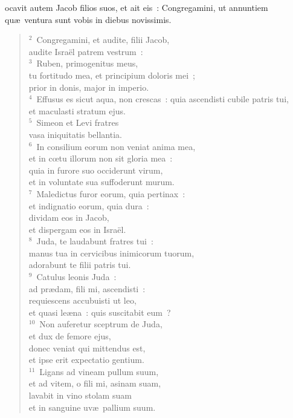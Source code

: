 \bchapter
{}ocavit autem Jacob filios suos, et ait eis~: Congregamini, ut annuntiem qu\ae\ ventura sunt vobis in diebus novissimis.
\begin{flushleft}\begin{verse}\vspace{6pt}${}^{2}$~Congregamini, et audite, filii Jacob,\\ audite Isra\"el patrem vestrum~:\\
${}^{3}$~Ruben, primogenitus meus,\\ tu fortitudo mea, et principium doloris mei~;\\ prior in donis, major in imperio.\\
${}^{4}$~Effusus es sicut aqua, non crescas~: quia ascendisti cubile patris tui,\\ et maculasti stratum ejus.\\
${}^{5}$~Simeon et Levi fratres\\ vasa iniquitatis bellantia.\\
${}^{6}$~In consilium eorum non veniat anima mea,\\ et in cœtu illorum non sit gloria mea~:\\ quia in furore suo occiderunt virum,\\ et in voluntate sua suffoderunt murum.\\
${}^{7}$~Maledictus furor eorum, quia pertinax~:\\ et indignatio eorum, quia dura~:\\ dividam eos in Jacob,\\ et dispergam eos in Isra\"el.\\
${}^{8}$~Juda, te laudabunt fratres tui~:\\ manus tua in cervicibus inimicorum tuorum,\\ adorabunt te filii patris tui.\\
${}^{9}$~Catulus leonis Juda~:\\ ad pr\ae dam, fili mi, ascendisti~:\\ requiescens accubuisti ut leo,\\ et quasi le\ae na~: quis suscitabit eum~?\\
${}^{10}$~Non auferetur sceptrum de Juda,\\ et dux de femore ejus,\\ donec veniat qui mittendus est,\\ et ipse erit expectatio gentium.\\
${}^{11}$~Ligans ad vineam pullum suum,\\ et ad vitem, o fili mi, asinam suam,\\ lavabit in vino stolam suam\\ et in sanguine uv\ae\ pallium suum.\\

\end{verse}
\end{flushleft}
